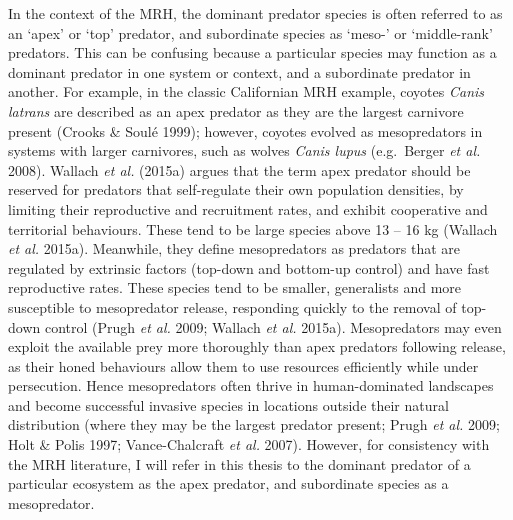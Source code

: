 \documentclass[11pt,a4paper,titlepage,twoside,openright]{style/unimelbthesis}
\begin{document}
\begin{mainmatter}
In the context of the MRH, the dominant predator species is often referred to as an `apex' or `top' predator, and subordinate species as `meso-' or `middle-rank' predators. This can be confusing because a particular species may function as a dominant predator in one system or context, and a subordinate predator in another. For example, in the classic Californian MRH example, coyotes \emph{Canis latrans} are described as an apex predator as they are the largest carnivore present (Crooks \& Soulé 1999); however, coyotes evolved as mesopredators in systems with larger carnivores, such as wolves \emph{Canis lupus} (e.g.~Berger \emph{et al.} 2008). Wallach \emph{et al.} (2015a) argues that the term apex predator should be reserved for predators that self-regulate their own population densities, by limiting their reproductive and recruitment rates, and exhibit cooperative and territorial behaviours. These tend to be large species above 13 -- 16 kg (Wallach \emph{et al.} 2015a). Meanwhile, they define mesopredators as predators that are regulated by extrinsic factors (top-down and bottom-up control) and have fast reproductive rates. These species tend to be smaller, generalists and more susceptible to mesopredator release, responding quickly to the removal of top-down control (Prugh \emph{et al.} 2009; Wallach \emph{et al.} 2015a). Mesopredators may even exploit the available prey more thoroughly than apex predators following release, as their honed behaviours allow them to use resources efficiently while under persecution. Hence mesopredators often thrive in human-dominated landscapes and become successful invasive species in locations outside their natural distribution (where they may be the largest predator present; Prugh \emph{et al.} 2009; Holt \& Polis 1997; Vance-Chalcraft \emph{et al.} 2007). However, for consistency with the MRH literature, I will refer in this thesis to the dominant predator of a particular ecosystem as the apex predator, and subordinate species as a mesopredator.


\end{mainmatter}
\end{document}

